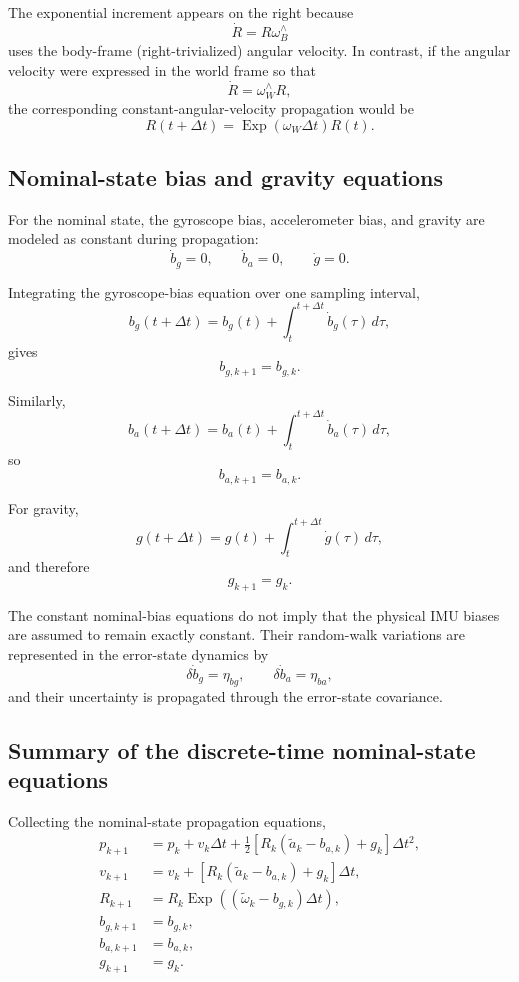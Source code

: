 \documentclass[11pt]{article}
\numberwithin{equation}{section}
\newcommand{\Exp}{\operatorname{Exp}}
\begin{document}
The exponential increment appears on the right because
\[
\dot R=R\omega_B^\wedge
\]
uses the body-frame (right-trivialized) angular velocity.  In contrast,
if the angular velocity were expressed in the world frame so that
\[
\dot R=\omega_W^\wedge R,
\]
the corresponding constant-angular-velocity propagation would be
\[
R(t+\Delta t)
=
\Exp(\omega_W\Delta t)R(t).
\]



\subsection{Nominal-state bias and gravity equations}

For the nominal state, the gyroscope bias, accelerometer bias, and
gravity are modeled as constant during propagation:
\[
\dot b_g=0,
\qquad
\dot b_a=0,
\qquad
\dot g=0.
\]

Integrating the gyroscope-bias equation over one sampling interval,
\[
b_g(t+\Delta t)
=
b_g(t)
+
\int_t^{t+\Delta t}\dot b_g(\tau)\,d\tau,
\]
gives
\begin{equation}
\boxed{
b_{g,k+1}=b_{g,k}.
}
\end{equation}

Similarly,
\[
b_a(t+\Delta t)
=
b_a(t)
+
\int_t^{t+\Delta t}\dot b_a(\tau)\,d\tau,
\]
so
\begin{equation}
\boxed{
b_{a,k+1}=b_{a,k}.
}
\end{equation}

For gravity,
\[
g(t+\Delta t)
=
g(t)
+
\int_t^{t+\Delta t}\dot g(\tau)\,d\tau,
\]
and therefore
\begin{equation}
\boxed{
g_{k+1}=g_k.
}
\end{equation}

The constant nominal-bias equations do not imply that the physical IMU
biases are assumed to remain exactly constant.  Their random-walk
variations are represented in the error-state dynamics by
\[
\delta\dot b_g=\eta_{bg},
\qquad
\delta\dot b_a=\eta_{ba},
\]
and their uncertainty is propagated through the error-state covariance.


\subsection{Summary of the discrete-time nominal-state equations}

Collecting the nominal-state propagation equations,
\begin{equation}
\boxed{
\begin{aligned}
p_{k+1}
&=
p_k+v_k\Delta t
+\frac12
\left[
R_k(\tilde a_k-b_{a,k})+g_k
\right]\Delta t^2,
\\[1mm]
v_{k+1}
&=
v_k+
\left[
R_k(\tilde a_k-b_{a,k})+g_k
\right]\Delta t,
\\[1mm]
R_{k+1}
&=
R_k
\Exp\!\left(
(\tilde\omega_k-b_{g,k})\Delta t
\right),
\\[1mm]
b_{g,k+1}
&=
b_{g,k},
\\
b_{a,k+1}
&=
b_{a,k},
\\
g_{k+1}
&=
g_k.
\end{aligned}
}
\end{equation}
\end{document}
